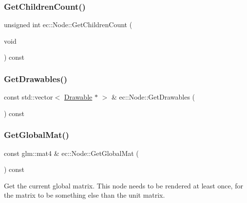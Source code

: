 \mbox{\label{classec_1_1_node_afc08689badadadcbbca919858994d30b}} 
\subsubsection{\texorpdfstring{Get\+Children\+Count()}{GetChildrenCount()}}
{\footnotesize\ttfamily unsigned int ec\+::\+Node\+::\+Get\+Children\+Count (\begin{DoxyParamCaption}\item[{void}]{ }\end{DoxyParamCaption}) const}

\mbox{\label{classec_1_1_node_ab1cd50204e1b38c9c1b31e46d13ea915}} 
\subsubsection{\texorpdfstring{Get\+Drawables()}{GetDrawables()}}
{\footnotesize\ttfamily const std\+::vector$<$ \mbox{\hyperlink{classec_1_1_drawable}{Drawable}} $\ast$ $>$ \& ec\+::\+Node\+::\+Get\+Drawables (\begin{DoxyParamCaption}{ }\end{DoxyParamCaption}) const\hspace{0.3cm}{\ttfamily [virtual]}}

\mbox{\label{classec_1_1_node_aafbc9c31eb710b1ac22834792e039435}} 
\subsubsection{\texorpdfstring{Get\+Global\+Mat()}{GetGlobalMat()}}
{\footnotesize\ttfamily const glm\+::mat4 \& ec\+::\+Node\+::\+Get\+Global\+Mat (\begin{DoxyParamCaption}{ }\end{DoxyParamCaption}) const}

Get the current global matrix. This node needs to be rendered at least once, for the matrix to be something else than the unit matrix. \mbox{\label{classec_1_1_node_a0acfd7f3ead66d1694d2147383432da8}} 
